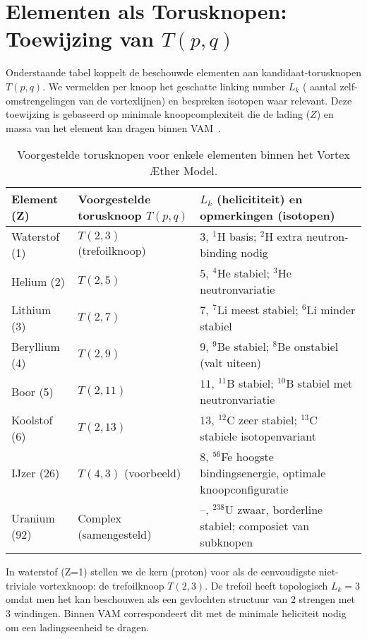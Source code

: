 \section{Elementen als Torusknopen: Toewijzing van $T(p,q)$}

Onderstaande tabel koppelt de beschouwde elementen aan kandidaat-torusknopen $T(p,q)$. We vermelden per knoop het geschatte linking number $L_k$ (
aantal zelf-omstrengelingen van de vortexlijnen) en bespreken isotopen waar relevant. Deze toewijzing is gebaseerd op minimale knoopcomplexiteit die de lading ($Z$) en massa van het element kan dragen binnen VAM~\cite{Kleckner2013KnotsVortex}.

\begin{table}[h!]
    \centering
    \begin{tabular}{lll}
        \hline
        Element (Z) & Voorgestelde torusknoop $T(p,q)$ & $L_k$ (helicititeit) en opmerkingen (isotopen)\\
        \hline
        Waterstof (1) & $T(2,3)$ (trefoilknoop)~\cite{Faddeev1997KnottedSolitions} & $3$, $^1$H basis; $^2$H extra neutron-binding nodig\\
        Helium (2) & $T(2,5)$ & $5$, $^4$He stabiel; $^3$He neutronvariatie\\
        Lithium (3) & $T(2,7)$ & $7$, $^7$Li meest stabiel; $^6$Li minder stabiel\\
        Beryllium (4) & $T(2,9)$ & $9$, $^9$Be stabiel; $^8$Be onstabiel (valt uiteen)\\
        Boor (5) & $T(2,11)$ & $11$, $^{11}$B stabiel; $^{10}$B stabiel met neutronvariatie\\
        Koolstof (6) & $T(2,13)$ & $13$, $^{12}$C zeer stabiel; $^{13}$C stabiele isotopenvariant\\
        IJzer (26) & $T(4,3)$ (voorbeeld) & $8$, $^{56}$Fe hoogste bindingsenergie, optimale knoopconfiguratie\\
        Uranium (92) & Complex (samengesteld) & –, $^{238}$U zwaar, borderline stabiel; composiet van subknopen\\
        \hline
    \end{tabular}
    \caption{Voorgestelde torusknopen voor enkele elementen binnen het Vortex Æther Model.}
\end{table}

In waterstof (Z=1) stellen we de kern (proton) voor als de eenvoudigste niet-triviale vortexknoop: de trefoilknoop $T(2,3)$. De trefoil heeft topologisch $L_k=3$ omdat men het kan beschouwen als een gevlochten structuur van 2 strengen met 3 windingen. Binnen VAM correspondeert dit met de minimale heliciteit nodig om een ladingseenheid te dragen.

